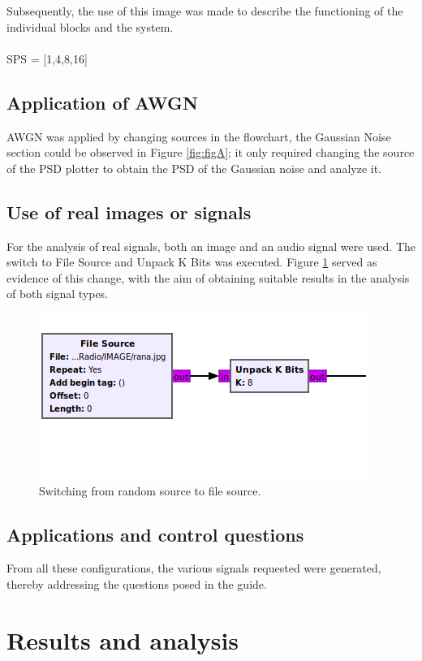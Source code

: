 \documentclass{journal}[IEEEtran, twocolumn]             %
\begin{document}
\begin{multicols}{2}
Subsequently, the use of this image was made to describe the functioning of the individual blocks and the system.\\
\\
SPS = [1,4,8,16]

\subsection{Application of AWGN}

AWGN was applied by changing sources in the flowchart, the Gaussian Noise section could be observed in Figure \ref{fig:figA}; it only required changing the source of the PSD plotter to obtain the PSD of the Gaussian noise and analyze it.

\subsection{Use of real images or signals}

For the analysis of real signals, both an image and an audio signal were used. The switch to File Source and Unpack K Bits was executed. Figure \ref{fig:figB} served as evidence of this change, with the aim of obtaining suitable results in the analysis of both signal types.

\begin{figure}[H]
    \centering
        \centering
        \includegraphics[width=0.35\columnwidth]{figs/Signal.png}
    \caption{Switching from random source to file source.}
    \label{fig:figB}
\end{figure}


\subsection{Applications and control questions}

From all these configurations, the various signals requested were generated, thereby addressing the questions posed in the guide.
    
\section{Results and analysis}


\end{multicols}
\end{document}

